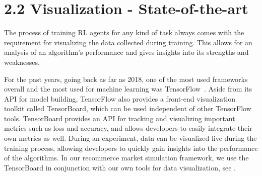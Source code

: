 
\section*{2.2 Visualization - State-of-the-art}

The process of training RL agents for any kind of task always comes with the requirement for visualizing the data collected during training. This allows for an analysis of an algorithm's performance and gives insights into its strengths and weaknesses.

For the past years, going back as far as 2018, one of the most used frameworks overall and the most used for machine learning was TensorFlow~\cite{StackOverflowSurvey}. Aside from its API for model building, TensorFlow also provides a front-end visualization toolkit called TensorBoard, which can be used independent of other TensorFlow tools. TensorBoard provides an API for tracking and visualizing important metrics such as loss and accuracy, and allows developers to easily integrate their own metrics as well. During an experiment, data can be visualized live during the training process, allowing developers to quickly gain insights into the performance of the algorithms. In our recommerce market simulation framework, we use the TensorBoard in conjunction with our own tools for data visualization, see .

